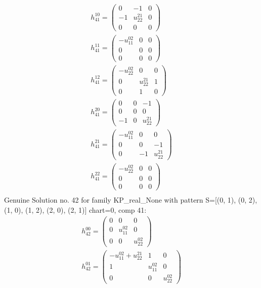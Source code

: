 \documentclass[a4paper, 11pt, twoside, onecolumn]{article}
\begin{document}
\begin{landscape}
\begin{gather*}
	 h_{41}^{10}=\begin{pmatrix}0 & -1 & 0\\-1 & u^{21}_{22} & 0\\0 & 0 & 0\end{pmatrix}\\ 
	 h_{41}^{11}=\begin{pmatrix}- u^{02}_{11} & 0 & 0\\0 & 0 & 0\\0 & 0 & 0\end{pmatrix}\\ 
	 h_{41}^{12}=\begin{pmatrix}- u^{02}_{22} & 0 & 0\\0 & u^{21}_{22} & 1\\0 & 1 & 0\end{pmatrix}\\ 
	 h_{41}^{20}=\begin{pmatrix}0 & 0 & -1\\0 & 0 & 0\\-1 & 0 & u^{21}_{22}\end{pmatrix}\\ 
	 h_{41}^{21}=\begin{pmatrix}- u^{02}_{11} & 0 & 0\\0 & 0 & -1\\0 & -1 & u^{21}_{22}\end{pmatrix}\\ 
	 h_{41}^{22}=\begin{pmatrix}- u^{02}_{22} & 0 & 0\\0 & 0 & 0\\0 & 0 & 0\end{pmatrix}\\ 
\end{gather*} 
Genuine Solution no. 42 for family KP_real_None with pattern S=[(0, 1), (0, 2), (1, 0), (1, 2), (2, 0), (2, 1)] chart=0, comp 41: 
\begin{gather*} 
	 h_{42}^{00}=\begin{pmatrix}0 & 0 & 0\\0 & u^{02}_{11} & 0\\0 & 0 & u^{02}_{22}\end{pmatrix}\\ 
	 h_{42}^{01}=\begin{pmatrix}- u^{02}_{11} + u^{21}_{22} & 1 & 0\\1 & u^{02}_{11} & 0\\0 & 0 & u^{02}_{22}\end{pmatrix}\\ 

\end{gather*}
\end{landscape}
\end{document}
